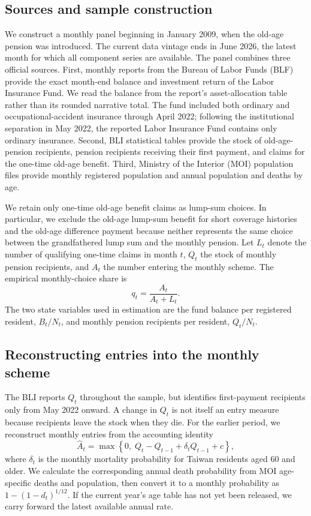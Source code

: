 \documentclass[a4paper, 12pt]{article}
\begin{document}
\subsection{Sources and sample construction}
We construct a monthly panel beginning in January 2009, when the old-age pension
was introduced. The current data vintage ends in June 2026, the latest month for
which all component series are available. The panel combines three official
sources. First, monthly reports from the Bureau of Labor Funds (BLF) provide the
exact month-end balance and investment return of the Labor Insurance Fund. We
read the balance from the report's asset-allocation table rather than its rounded
narrative total. The fund included both ordinary and occupational-accident
insurance through April 2022; following the institutional separation in May
2022, the reported Labor Insurance Fund contains only ordinary insurance.
Second, BLI statistical tables provide the stock of
old-age-pension recipients, pension recipients receiving their first payment,
and claims for the one-time old-age benefit.
Third, Ministry of the Interior (MOI) population files provide monthly registered
population and annual population and deaths by age.

We retain only one-time old-age benefit claims as lump-sum choices. In
particular, we exclude the old-age lump-sum benefit for short coverage histories
and the old-age difference payment because neither represents the same choice
between the grandfathered lump sum and the monthly pension. Let $L_t$ denote the
number of qualifying one-time claims in month $t$, $Q_t$ the stock of monthly
pension recipients, and $A_t$ the number entering the monthly scheme. The
empirical monthly-choice share is
\begin{equation}\label{eq:data_q}
    q_t = \frac{A_t}{A_t+L_t}.
\end{equation}
The two state variables used in estimation are the fund balance per registered
resident, $B_t/N_t$, and monthly pension recipients per resident, $Q_t/N_t$.

\subsection{Reconstructing entries into the monthly scheme}
The BLI reports $Q_t$ throughout the sample, but identifies first-payment
recipients only from May 2022 onward. A change in $Q_t$ is not itself an entry
measure because recipients leave the stock when they die. For the earlier
period, we reconstruct monthly entries from the accounting identity
\begin{equation}\label{eq:entry_reconstruction}
    \widehat A_t
    = \max\left\{0,\;Q_t-Q_{t-1}+\delta_t Q_{t-1}+c\right\},
\end{equation}
where $\delta_t$ is the monthly mortality probability for Taiwan residents aged
60 and older. We calculate the corresponding annual death probability from MOI
age-specific deaths and population, then convert it to a monthly probability as
$1-(1-d_t)^{1/12}$. If the current year's age table has not yet been released,
we carry forward the latest available annual rate.
\end{document}
